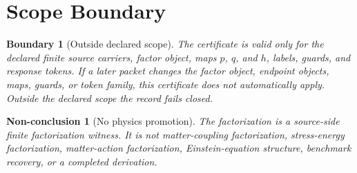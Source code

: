 \documentclass[11pt]{article}
\newtheorem{boundary}{Boundary}
\newtheorem{nonconclusion}{Non-conclusion}
\begin{document}
\section{Scope Boundary}

\begin{boundary}[Outside declared scope]
The certificate is valid only for the declared finite source carriers,
factor object, maps \(p\), \(q\), and \(h\), labels, guards, and response
tokens. If a later packet changes the factor object, endpoint objects, maps,
guards, or token family, this certificate does not automatically apply.
Outside the declared scope the record fails closed.
\end{boundary}

\begin{nonconclusion}[No physics promotion]
The factorization is a source-side finite factorization witness. It is not
matter-coupling factorization, stress-energy factorization, matter-action
factorization, Einstein-equation structure, benchmark recovery, or a
completed derivation.
\end{nonconclusion}
\end{document}
